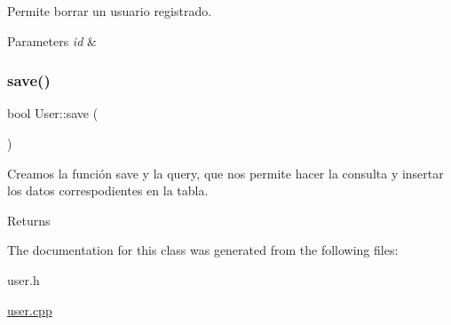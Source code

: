 Permite borrar un usuario registrado. 


\begin{DoxyParams}{Parameters}
{\em id} & \\
\hline
\end{DoxyParams}
\mbox{\label{classUser_a6bc3635e377a3d934379add410fcf9c0}} 
\subsubsection{\texorpdfstring{save()}{save()}}
{\footnotesize\ttfamily bool User\+::save (\begin{DoxyParamCaption}{ }\end{DoxyParamCaption})}



Creamos la función save y la query, que nos permite hacer la consulta y insertar los datos correspodientes en la tabla. 

\begin{DoxyReturn}{Returns}

\end{DoxyReturn}


The documentation for this class was generated from the following files\+:\begin{DoxyCompactItemize}
\item 
user.\+h\item 
\mbox{\hyperlink{user_8cpp}{user.\+cpp}}\end{DoxyCompactItemize}
